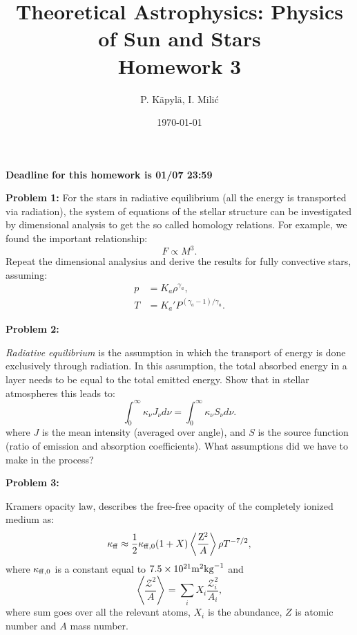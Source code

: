 \documentclass[12pt]{article}
\title{Theoretical Astrophysics: Physics of Sun and Stars\\
Homework 3}
\author{P. K\"{a}pyl\"{a}, I. Mili\'{c}}
\date{\today}
\begin{document}
\maketitle

\textbf{Deadline for this homework is \textbf{01}/07 23:59}

{\bf Problem 1:} For the stars in radiative equilibrium (all the energy is transported via radiation), the system of equations of the stellar structure can be investigated by dimensional analysis to get the so called homology relations. For example, we found the important relationship:
\begin{equation}
F \propto M^3.
\end{equation}
Repeat the dimensional analysius and derive the results for fully convective stars, assuming:
\begin{align}
p &= K_a \rho^{\gamma_a}, \\
T &= K_a' P ^{(\gamma_a-1)/\gamma_a}.
\end{align}

{\bf Problem 2:} 

\emph{Radiative equilibrium} is the assumption in which the transport of energy is done exclusively through radiation. In this assumption, the total absorbed energy in a layer needs to be equal to the total emitted energy. Show that in stellar atmospheres this leads to: 
\begin{equation}
 \int_0^{\infty} \kappa_\nu J_\nu d\nu = \int_0^{\infty} \kappa_\nu S_\nu d\nu.
\end{equation}
where $J$ is the mean intensity (averaged over angle), and $S$ is the source function (ratio of emission and absorption coefficients). What assumptions did we have to make in the process?


{\bf Problem 3:}

Kramers opacity law, describes the free-free opacity of the completely ionized medium as:
\begin{equation}
  \kappa_{\rm ff} \approx \frac{1}{2} \kappa_{\rm ff,0} (1+X) \left< \frac{\rm Z^2}{A} \right> \rho T^{-7/2},
\end{equation}
where $\kappa_{\rm ff,0}$ is a constant equal to $7.5 \times 10^{21} {\rm m}^2 {\rm kg}^{-1}$ and 
\begin{equation}
  \left< \frac{\mathcal Z^2}{A} \right> = \sum_i X_i \frac{\mathcal Z_i^2}{A_i},
\end{equation}
where sum goes over all the relevant atoms, $X_i$ is the abundance, $Z$ is atomic number and $A$ mass number. 
\end{document}
